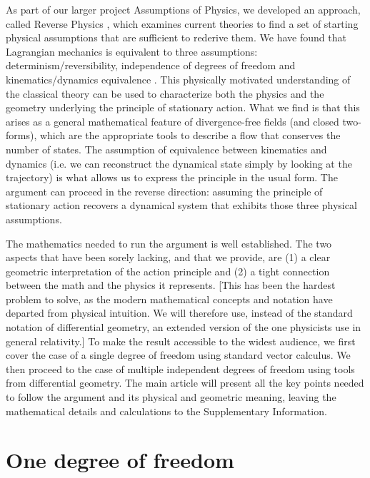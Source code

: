 \documentclass[fleqn,10pt]{wlscirep}
\begin{document}
As part of our larger project Assumptions of Physics, we developed an approach, called Reverse Physics \cite{aop-phys-ReversePhysics}, which examines current theories to find a set of starting physical assumptions that are sufficient to rederive them. We have found that Lagrangian mechanics is equivalent to three assumptions: determinism/reversibility, independence of degrees of freedom and kinematics/dynamics equivalence \cite{aop-phys-blueprint}. This physically motivated understanding of the classical theory can be used to characterize both the physics and the geometry underlying the principle of stationary action. What we find is that this arises as a general mathematical feature of divergence-free fields (and closed two-forms), which are the appropriate tools to describe a flow that conserves the number of states. The assumption of equivalence between kinematics and dynamics (i.e. we can reconstruct the dynamical state simply by looking at the trajectory) is what allows us to express the principle in the usual form. The argument can proceed in the reverse direction: assuming the principle of stationary action recovers a dynamical system that exhibits those three physical assumptions.

The mathematics needed to run the argument is well established\cite{souriau1970structure, abraham1978foundations,arnold1989mathematical, marsden1999introduction}. The two aspects that have been sorely lacking, and that we provide, are (1) a clear geometric interpretation of the action principle and (2) a tight connection between the math and the physics it represents. [This has been the hardest problem to solve, as the modern mathematical concepts and notation have departed from physical intuition. We will therefore use, instead of the standard notation of differential geometry, an extended version of the one physicists use in general relativity.] To make the result accessible to the widest audience, we first cover the case of a single degree of freedom using standard vector calculus. We then proceed to the case of multiple independent degrees of freedom using tools from differential geometry. The main article will present all the key points needed to follow the argument and its physical and geometric meaning, leaving the mathematical details and calculations to the Supplementary Information.

\section*{One degree of freedom}
\end{document}
